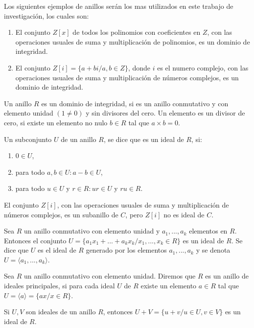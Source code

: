 Los siguientes ejemplos de anillos serán los mas utilizados en este trabajo de investigación, los cuales son:
\begin{enumerate}
    \item El conjunto $Z[x]$ de todos los polinomios con coeficientes en $Z$, con las operaciones usuales de suma y multiplicación de polinomios, es un dominio de integridad.
    \item El conjunto $Z[i]=\lbrace a+bi/a,b\in Z \rbrace$, donde $i$ es el numero complejo, con las operaciones usuales de suma y multiplicación de números complejos, es un dominio de integridad.
\end{enumerate}
Un anillo $R$ es un dominio de integridad, si es un anillo conmutativo y con elemento unidad $(1\neq 0)$ y sin divisores del cero. Un elemento es un divisor de cero, si existe un elemento no nulo $b\in R$ tal que $a\times b = 0$.
\begin{defi}
Un subconjunto $U$ de un anillo $R$, se dice que es un ideal de $R$, si:
\begin{enumerate}
    \item $0\in U$,
    \item para todo $a,b\in U:a-b\in U$,
    \item para todo $u\in U$ y $r\in R : ur\in U$ y $ru\in R$.
\end{enumerate}
\end{defi}
\begin{ejemplo}
El conjunto $Z[i]$, con las operaciones usuales de suma y multiplicación de números complejos, es un subanillo de $C$, pero $Z[i]$ no es ideal de $C$.
\end{ejemplo}
\begin{teo}
Sea $R$ un anillo conmutativo con elemento unidad y $a_{1},...,a_{k}$ elementos en $R$. Entonces el conjunto $U=\lbrace a_{1}x_{1}+...+a_{k}x_{k}/x_{1},...,x_{k}\in R \rbrace$ es un ideal de $R$. Se dice que $U$ es el ideal de $R$ generado por los elementos $a_{1},...,a_{k}$ y se denota $U=\langle a_{1},...,a_{k} \rangle$.
\end{teo}
\begin{defi}
Sea $R$ un anillo conmutativo con elemento unidad. Diremos que $R$ es un anillo de ideales principales, si para cada ideal $U$ de $R$ existe un elemento $a\in R$ tal que $U = \langle a \rangle = \lbrace ax / x\in R \rbrace$.
\end{defi}
\begin{lema}
Si $U, V$ son ideales de un anillo $R$, entonces $U+V=\lbrace u+v/u\in U,v\in V\rbrace$ es un ideal de $R$.
\end{lema}

